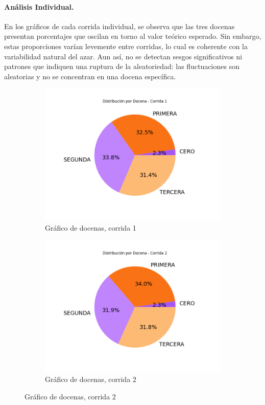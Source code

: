 \documentclass{article}
\begin{document}
\paragraph{Análisis Individual.}
En los gráficos de cada corrida individual, se observa que las tres docenas presentan porcentajes que oscilan en torno al valor teórico esperado. Sin embargo, estas proporciones varían levemente entre corridas, lo cual es coherente con la variabilidad natural del azar. Aun así, no se detectan sesgos significativos ni patrones que indiquen una ruptura de la aleatoriedad: las fluctuaciones son aleatorias y no se concentran en una docena específica.
\begin{figure}[H]
    \centering
    \begin{subfigure}[b]{0.45\textwidth}
        \centering
        \includegraphics[width=\textwidth]{Imagenes/GraficoTorta_corrida_1.png}
        \caption{Gráfico de docenas, corrida 1}
    \end{subfigure}
    \hfill
    \begin{subfigure}[b]{0.45\textwidth}
        \centering
        \includegraphics[width=\textwidth]{Imagenes/GraficoTorta_corrida_2.png}
        \caption{Gráfico de docenas, corrida 2}
    \end{subfigure}
    

\end{figure}
\end{document}
